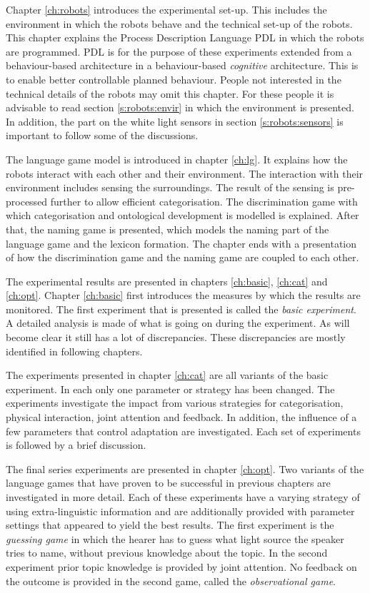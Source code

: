 Chapter \ref{ch:robots} introduces the experimental set-up. This includes the environment in which the robots behave and the technical set-up of the robots. This chapter explains the Process Description Language PDL in which the robots are programmed. PDL is for the purpose of these experiments extended from a behaviour-based architecture in a behaviour-based {\em cognitive} architecture. This is to enable better controllable planned behaviour. People not interested in the technical details of the robots may omit this chapter. For these people it is advisable to read section \ref{s:robots:envir} in which the environment is presented. In addition, the part on the white light sensors in section \ref{s:robots:sensors} is important to follow some of the discussions.

The language game model is introduced in chapter \ref{ch:lg}. It explains how the robots interact with each other and their environment. The interaction with their environment includes sensing the surroundings. The result of the sensing is pre-processed further to allow efficient categorisation. The discrimination game with which categorisation and ontological development is modelled is explained. After that, the naming game is presented, which models the naming part of the language game and the lexicon formation. The chapter ends with a presentation of how the discrimination game and the naming game are coupled to each other.


The experimental results are presented in chapters \ref{ch:basic}, \ref{ch:cat} and \ref{ch:opt}. Chapter \ref{ch:basic} first introduces the measures by which the results are monitored. The first experiment that is presented is called the {\em basic experiment}. A detailed analysis is made of what is going on during the experiment. As will become clear it still has a lot of discrepancies. These discrepancies are mostly identified in following chapters. 

The experiments presented in chapter \ref{ch:cat} are all variants of the basic experiment. In each only one parameter or strategy has been changed. The experiments investigate the impact from various strategies for categorisation, physical interaction, joint attention and feedback. In addition, the influence of a few parameters that control adaptation are investigated. Each set of experiments is followed by a brief discussion.

The final series experiments are presented in chapter \ref{ch:opt}. Two variants of the language games that have proven to be successful in previous chapters are investigated in more detail. Each of these experiments have a varying strategy of using extra-linguistic information and are additionally provided with parameter settings that appeared to yield the best results. The first experiment is the {\em guessing game} in which the hearer has to guess what light source the speaker tries to name, without previous knowledge about the topic. In the second experiment prior topic knowledge is provided by joint attention. No feedback on the outcome is provided in the second game, called the {\em observational game}.


